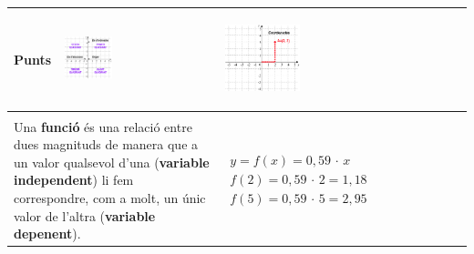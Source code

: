 \newpage
\resum
\begin{center}
	\renewcommand{\arraystretch}{1.5}
\begin{longtable}{|p{}|p{}|p{}|} 
	\hline 
	\cellcolor{lightgray}\textbf{Punts}
	 & \vspace{-0.25cm}
	 \begin{center}\includegraphics[width=0.32\textwidth]{img-08/image23.png}\end{center}\vspace{-0.25cm} & \vspace{-0.25cm} \begin{center}\includegraphics[width=0.32\textwidth]{img-08/image24.png}\end{center} \vspace{-0.25cm} \\ \hline
	 
	\rowcolor{lightgray} \multicolumn{3}{|p{\textwidth}|}{\textbf{Funció}} \\ \hline
 	 
\multicolumn{2}{|p{0.55\textwidth}|}{ Una \textbf{funció }és una relació entre dues magnituds de manera que a un valor qualsevol d'una (\textbf{variable independent}) li fem correspondre, com a molt, un únic valor de l'altra (\textbf{variable depenent}).} & 
\newline

$\begin{array}{l} {y=f\left(x\right)=0,59\, \cdot \, x} \\ {f\left(2\right)=0,59\, \cdot \, 2=1,18} \\ {f\left(5\right)=0,59\, \cdot \, 5=2,95} \end{array}$ \\ \hline 


\end{longtable}
\end{center}
